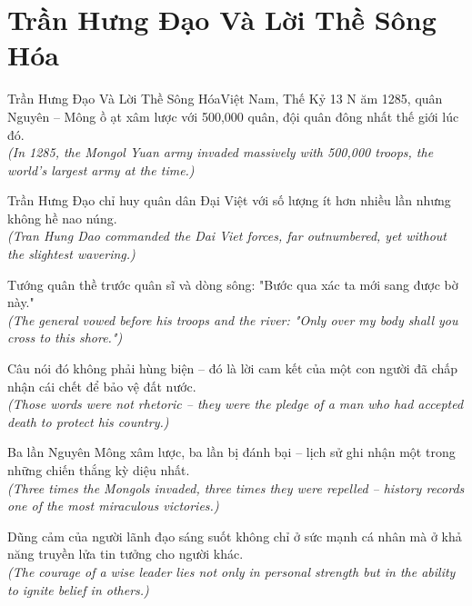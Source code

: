 \section{Trần Hưng Đạo Và Lời Thề Sông Hóa}
\begin{truyen}{Trần Hưng Đạo Và Lời Thề Sông Hóa}{Việt Nam, Thế Kỷ 13}
N ăm 1285, quân Nguyên -- Mông ồ ạt xâm lược với 500,000 quân, đội quân đông nhất thế giới lúc đó.\\
\textit{(In 1285, the Mongol Yuan army invaded massively with 500,000 troops, the world's largest army at the time.)}

Trần Hưng Đạo chỉ huy quân dân Đại Việt với số lượng ít hơn nhiều lần nhưng không hề nao núng.\\
\textit{(Tran Hung Dao commanded the Dai Viet forces, far outnumbered, yet without the slightest wavering.)}

Tướng quân thề trước quân sĩ và dòng sông: "Bước qua xác ta mới sang được bờ này."\\
\textit{(The general vowed before his troops and the river: "Only over my body shall you cross to this shore.")}

Câu nói đó không phải hùng biện -- đó là lời cam kết của một con người đã chấp nhận cái chết để bảo vệ đất nước.\\
\textit{(Those words were not rhetoric -- they were the pledge of a man who had accepted death to protect his country.)}

Ba lần Nguyên Mông xâm lược, ba lần bị đánh bại -- lịch sử ghi nhận một trong những chiến thắng kỳ diệu nhất.\\
\textit{(Three times the Mongols invaded, three times they were repelled -- history records one of the most miraculous victories.)}

\end{truyen}
\begin{baihoc}
  Dũng cảm của người lãnh đạo sáng suốt không chỉ ở sức mạnh cá nhân mà ở khả năng truyền lửa tin tưởng cho người khác.\\
  \textit{(The courage of a wise leader lies not only in personal strength but in the ability to ignite belief in others.)}
\end{baihoc}
